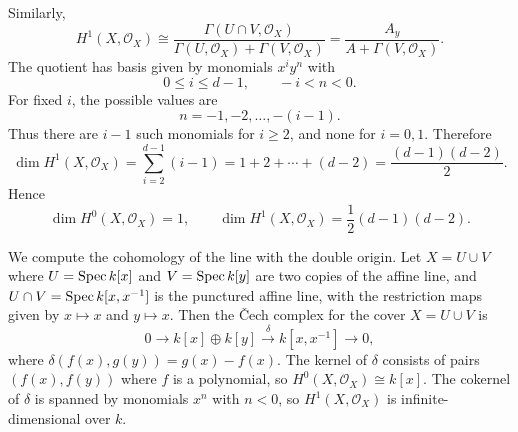 \documentclass[12pt]{article}
\begin{document}
\begin{solution}
    Similarly,
    \[
        H^1(X,\mathcal O_X)
        \cong
        \frac{\Gamma(U\cap V,\mathcal O_X)}
        {\Gamma(U,\mathcal O_X)+\Gamma(V,\mathcal O_X)}
        =
        \frac{A_y}{A+\Gamma(V,\mathcal O_X)}.
    \]
    The quotient has basis given by monomials $x^i y^n$
    with
    \[
        0\le i\le d-1,
        \qquad
        -i<n<0.
    \]
    For fixed $i$, the possible values are
    \[
        n=-1,-2,\dots,-(i-1).
    \]
    Thus there are $i-1$ such monomials for $i\ge 2$, and none for $i=0,1$. Therefore
    \[
        \dim H^1(X,\mathcal O_X)
        =
        \sum_{i=2}^{d-1}(i-1)
        =
        1+2+\cdots+(d-2)
        =
        \frac{(d-1)(d-2)}{2}.
    \]
    Hence
    \[
        \dim H^0(X,\mathcal O_X)=1,
        \qquad
        \dim H^1(X,\mathcal O_X)=\frac{1}{2}(d-1)(d-2).
    \]
\end{solution}

\begin{example}
    We compute the cohomology of the line with the double origin. Let $X = U\cup V$ where $U = \operatorname{Spec} k[x]$ and $V = \operatorname{Spec} k[y]$ are two copies of the affine line, and $U\cap V = \operatorname{Spec} k[x,x^{-1}]$ is the punctured affine line, with the restriction maps given by $x\mapsto x$ and $y\mapsto x$. Then the \v Cech complex for the cover $X=U\cup V$ is
    \[
        0\to
        k[x]\oplus k[y]
        \xrightarrow{\delta}
        k[x,x^{-1}]
        \to 0,
    \]
    where $\delta(f(x),g(y))=g(x)-f(x)$. The kernel of $\delta$ consists of pairs $(f(x),f(y))$ where $f$ is a polynomial, so $H^0(X,\mathcal O_X)\cong k[x]$. The cokernel of $\delta$ is spanned by monomials $x^n$ with $n<0$, so $H^1(X,\mathcal O_X)$ is infinite-dimensional over $k$.
\end{example}
\end{document}
